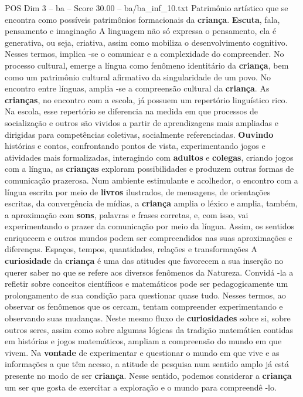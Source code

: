 \begin{textsample}{POS Dim 3 – ba – Score 30.00 – ba/ba\_inf\_10.txt}
Patrimônio artístico que se encontra como possíveis patrimônios formacionais da \textbf{criança}. \textbf{Escuta}, fala, pensamento e imaginação A linguagem não só expressa o pensamento, ela é generativa, ou seja, criativa, assim como mobiliza o desenvolvimento cognitivo.
Nesses termos, implica -se o comunicar e a complexidade do compreender.
No processo cultural, emerge a língua como fenômeno identitário da \textbf{criança}, bem como um patrimônio cultural afirmativo da singularidade de um povo.
No encontro entre línguas, amplia -se a compreensão cultural da \textbf{criança}.
As \textbf{crianças}, no encontro com a escola, já possuem um repertório linguístico rico.
Na escola, esse repertório se diferencia na medida em que processos de socialização e outros são vividos a partir de aprendizagens mais ampliadas e dirigidas para competências coletivas, socialmente referenciadas. \textbf{Ouvindo} histórias e contos, confrontando pontos de vista, experimentando jogos e atividades mais formalizadas, interagindo com \textbf{adultos} e \textbf{colegas}, criando jogos com a língua, as \textbf{crianças} exploram possibilidades e produzem outras formas de comunicação prazerosa.
Num ambiente estimulante e acolhedor, o encontro com a língua escrita por meio de \textbf{livros} ilustrados, de mensagens, de orientações escritas, da convergência de mídias, a \textbf{criança} amplia o léxico e amplia, também, a aproximação com \textbf{sons}, palavras e frases corretas, e, com isso, vai experimentando o prazer da comunicação por meio da língua.
Assim, os sentidos enriquecem e outros mundos podem ser compreendidos nas suas aproximações e diferenças.
Espaços, tempos, quantidades, relações e transformações A \textbf{curiosidade} da \textbf{criança} é uma das atitudes que favorecem a sua inserção no querer saber no que se refere aos diversos fenômenos da Natureza.
Convidá -la a refletir sobre conceitos científicos e matemáticos pode ser pedagogicamente um prolongamento de sua condição para questionar quase tudo.
Nesses termos, ao observar os fenômenos que os cercam, tentam compreender experimentando e observando suas mudanças.
Neste mesmo fluxo de \textbf{curiosidades} sobre si, sobre outros seres, assim como sobre algumas lógicas da tradição matemática contidas em histórias e jogos matemáticos, ampliam a compreensão do mundo em que vivem.
Na \textbf{vontade} de experimentar e questionar o mundo em que vive e as informações a que têm acesso, a atitude de pesquisa num sentido amplo já está presente no modo de ser \textbf{criança}.
Nesse sentido, podemos considerar a \textbf{criança} um ser que gosta de exercitar a exploração e o mundo para compreendê -lo.

\end{textsample}
